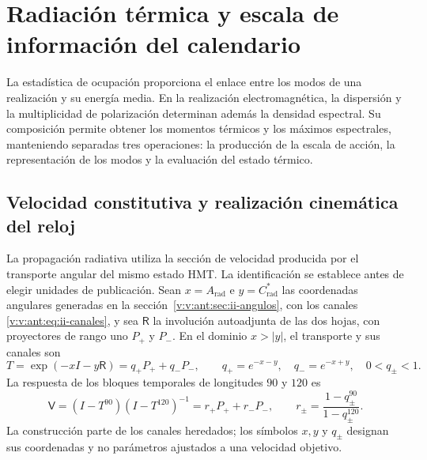 \section{Radiación térmica y escala de información del calendario}
\label{v:v:sec:radiacion-termica}

La estadística de ocupación proporciona el enlace entre los modos de
una realización y su energía media. En la realización electromagnética,
la dispersión y la multiplicidad de polarización determinan además la
densidad espectral. Su composición permite obtener los momentos térmicos
y los máximos espectrales, manteniendo separadas tres operaciones:
la producción de la escala de acción, la representación de los modos y
la evaluación del estado térmico.


\subsection{Velocidad constitutiva y realización cinemática del reloj}
\label{v:v:sec:enlace-velocidad-constitutiva}

La propagación radiativa utiliza la sección de velocidad producida por el
transporte angular del mismo estado HMT. La identificación se establece
antes de elegir unidades de publicación. Sean $x=A_{\mathrm{rad}}$ e
$y=C^*_{\mathrm{rad}}$ las coordenadas angulares generadas en la
sección~\ref{v:v:ant:sec:ii-angulos}, con los canales
\eqref{v:v:ant:eq:ii-canales}, y sea
$\mathsf R$ la involución autoadjunta de las dos hojas, con proyectores
de rango uno $P_+$ y $P_-$. En el dominio $x>|y|$, el transporte y sus
canales son
\begin{equation}
 T=\exp(-xI-y\mathsf R)=q_+P_++q_-P_-,
 \qquad q_+=e^{-x-y},\quad q_-=e^{-x+y},\quad 0<q_\pm<1.
 \label{v:v:eq:velocidad-transporte}
\end{equation}
La respuesta de los bloques temporales de longitudes $90$ y $120$ es
\begin{equation}
 \mathsf V=(I-T^{90})(I-T^{120})^{-1}
       =r_+P_++r_-P_-,\qquad
 r_\pm=\frac{1-q_\pm^{90}}{1-q_\pm^{120}}.
 \label{v:v:eq:velocidad-respuesta}
\end{equation}
La construcción parte de los canales heredados; los símbolos $x,y$ y
$q_\pm$ designan sus coordenadas y no parámetros ajustados a una velocidad
objetivo.

